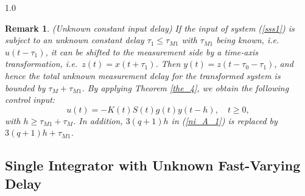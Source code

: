 \documentclass[journal]{IEEEtran}
\newtheorem{remark}{Remark}
\begin{document}
\begin{spacing}{1.0}
%
\begin{remark}
(Unknown constant input delay) If the input of system (\ref{sss1}) is subject to an unknown constant delay $\tau_{1}\leq\tau_{M1}$
with $\tau_{M1}$ being known, i.e.\ $u(t-\tau_{1})$, it can be shifted to the
measurement side by a time-axis transformation, i.e.\ $z(t)=x(t+\tau_{1})$.
Then $y(t)=z(t-\tau_{0}-\tau_{1})$, and hence the total unknown
measurement delay for the transformed system is bounded by
$\tau_{M}+\tau_{M1}$. By applying Theorem \ref{the_4}, we obtain the
following control input:
\[
u(t)=-K\left(  t\right) S(t)g\left(
t\right)  y\left(  t-h\right)  ,\quad t\geq0,
\]
with $h\geq\tau_{M1}+\tau_{M}$. In addition, $3(q+1)h$ in (\ref{ni_A_1}) is
replaced by $3(q+1)h+\tau_{M1}$.
\end{remark}
\subsection{Single Integrator with Unknown Fast-Varying Delay}


\end{spacing}
\end{document}
